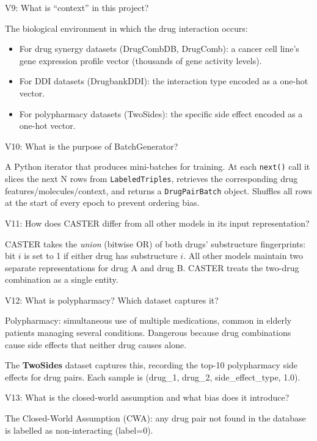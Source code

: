 \documentclass[12pt,a4paper,oneside]{book}
\begin{document}
\begin{tcolorbox}[vivabox]
V9: What is ``context'' in this project?
\end{tcolorbox}
The biological environment in which the drug interaction occurs:
\begin{itemize}
  \item For drug synergy datasets (DrugCombDB, DrugComb): a cancer cell line's gene expression profile vector (thousands of gene activity levels).
  \item For DDI datasets (DrugbankDDI): the interaction type encoded as a one-hot vector.
  \item For polypharmacy datasets (TwoSides): the specific side effect encoded as a one-hot vector.
\end{itemize}

\begin{tcolorbox}[vivabox]
V10: What is the purpose of BatchGenerator?
\end{tcolorbox}
A Python iterator that produces mini-batches for training. At each \texttt{next()} call it slices the next N rows from \texttt{LabeledTriples}, retrieves the corresponding drug features/molecules/context, and returns a \texttt{DrugPairBatch} object. Shuffles all rows at the start of every epoch to prevent ordering bias.

\begin{tcolorbox}[vivabox]
V11: How does CASTER differ from all other models in its input representation?
\end{tcolorbox}
CASTER takes the \textit{union} (bitwise OR) of both drugs' substructure fingerprints: bit $i$ is set to 1 if either drug has substructure $i$. All other models maintain two separate representations for drug A and drug B. CASTER treats the two-drug combination as a single entity.

\begin{tcolorbox}[vivabox]
V12: What is polypharmacy? Which dataset captures it?
\end{tcolorbox}
Polypharmacy: simultaneous use of multiple medications, common in elderly patients managing several conditions. Dangerous because drug combinations cause side effects that neither drug causes alone.

The \textbf{TwoSides} dataset captures this, recording the top-10 polypharmacy side effects for drug pairs. Each sample is (drug\_1, drug\_2, side\_effect\_type, 1.0).

\begin{tcolorbox}[vivabox]
V13: What is the closed-world assumption and what bias does it introduce?
\end{tcolorbox}
The Closed-World Assumption (CWA): any drug pair not found in the database is labelled as non-interacting (label=0). 
\end{document}
